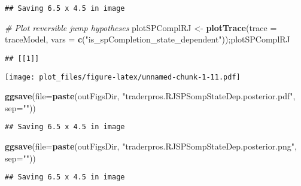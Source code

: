 \documentclass[
]{article}
\newenvironment{Shaded}{\begin{snugshade}}{\end{snugshade}}
\newcommand{\AttributeTok}[1]{\textcolor[rgb]{0.13,0.29,0.53}{#1}}
\newcommand{\CommentTok}[1]{\textcolor[rgb]{0.56,0.35,0.01}{\textit{#1}}}
\newcommand{\FunctionTok}[1]{\textcolor[rgb]{0.13,0.29,0.53}{\textbf{#1}}}
\newcommand{\NormalTok}[1]{#1}
\newcommand{\OtherTok}[1]{\textcolor[rgb]{0.56,0.35,0.01}{#1}}
\newcommand{\StringTok}[1]{\textcolor[rgb]{0.31,0.60,0.02}{#1}}
\begin{document}
\begin{verbatim}
## Saving 6.5 x 4.5 in image
\end{verbatim}

\begin{Shaded}
\begin{Highlighting}[]
\CommentTok{\# Plot reversible jump hypotheses}
\NormalTok{plotSPComplRJ }\OtherTok{\textless{}{-}} \FunctionTok{plotTrace}\NormalTok{(}\AttributeTok{trace =}\NormalTok{ traceModel, }
                             \AttributeTok{vars =} \FunctionTok{c}\NormalTok{(}\StringTok{"is\_spCompletion\_state\_dependent"}\NormalTok{));plotSPComplRJ}
\end{Highlighting}
\end{Shaded}

\begin{verbatim}
## [[1]]
\end{verbatim}

\texttt{[image: plot\_files/figure-latex/unnamed-chunk-1-11.pdf]}

\begin{Shaded}
\begin{Highlighting}[]
\FunctionTok{ggsave}\NormalTok{(}\AttributeTok{file=}\FunctionTok{paste}\NormalTok{(outFigsDir, }\StringTok{"traderpros.RJSPSompStateDep.posterior.pdf"}\NormalTok{, }\AttributeTok{sep=}\StringTok{""}\NormalTok{)) }
\end{Highlighting}
\end{Shaded}

\begin{verbatim}
## Saving 6.5 x 4.5 in image
\end{verbatim}

\begin{Shaded}
\begin{Highlighting}[]
\FunctionTok{ggsave}\NormalTok{(}\AttributeTok{file=}\FunctionTok{paste}\NormalTok{(outFigsDir, }\StringTok{"traderpros.RJSPSompStateDep.posterior.png"}\NormalTok{, }\AttributeTok{sep=}\StringTok{""}\NormalTok{)) }
\end{Highlighting}
\end{Shaded}

\begin{verbatim}
## Saving 6.5 x 4.5 in image
\end{verbatim}
\end{document}
